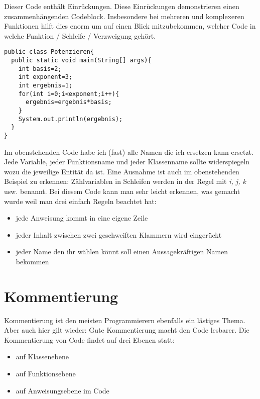 Dieser Code enthält Einrückungen. Diese Einrückungen demonstrieren einen zusammenhängenden Codeblock. Insbesondere bei mehreren und komplexeren Funktionen hilft dies enorm um auf einen Blick mitzubekommen, welcher Code in welche Funktion / Schleife / Verzweigung gehört.

\begin{minipage}{\textwidth}
\begin{lstlisting}
public class Potenzieren{
  public static void main(String[] args){
    int basis=2;
    int exponent=3;
    int ergebnis=1;
    for(int i=0;i<exponent;i++){
      ergebnis=ergebnis*basis;
    }
    System.out.println(ergebnis);
  }
}
\end{lstlisting}
\end{minipage}

Im obenstehenden Code habe ich (fast) alle Namen die ich ersetzen kann ersetzt. Jede Variable, jeder Funktionsname und jeder Klassenname sollte widerspiegeln wozu die jeweilige Entität da ist. Eine Ausnahme ist auch im obenstehenden Beispiel zu erkennen: Zählvariablen in Schleifen werden in der Regel mit \textit{i, j, k} usw. benannt. Bei diesem Code kann man sehr leicht erkennen, was gemacht wurde weil man drei einfach Regeln beachtet hat:

\begin{itemize}
	\item jede Anweisung kommt in eine eigene Zeile
	\item jeder Inhalt zwischen zwei geschweiften Klammern wird eingerückt
	\item jeder Name den ihr wählen könnt soll einen Aussagekräftigen Namen bekommen
\end{itemize}

\section{Kommentierung}

Kommentierung ist den meisten Programmierern ebenfalls ein lästiges Thema. Aber auch hier gilt wieder: Gute Kommentierung macht den Code lesbarer. Die Kommentierung von Code findet auf drei Ebenen statt:

\begin{itemize}
	\item auf Klassenebene
	\item auf Funktionsebene
	\item auf Anweisungsebene im Code
\end{itemize}

